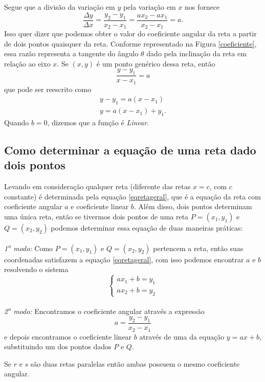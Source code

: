 Segue que a divisão da variação em $y$ pela variação em $x$ nos fornece
\begin{equation}\label{eqdelta}
  \frac{\Delta y}{\Delta x}
  = \frac{y_2-y_1}{x_2-x_1}
  = \frac{ax_2-ax_1}{x_2-x_1}
  = a.
\end{equation}
Isso quer dizer que podemos obter o valor do coeficiente angular da reta a
partir de dois pontos quaisquer da reta.
Conforme representado na Figura \ref{coeficiente}, essa razão representa
a tangente do ângulo $\theta$ dado pela inclinação da reta em relação
ao eixo $x$.
Se $(x, y)$ é um ponto genérico dessa reta, então
\[
  \frac{y-y_1}{x-x_1}=a
\]
que pode ser reescrito como
\begin{gather*}
  y-y_1 = a(x-x_1)  \nonumber \\
  y = a(x-x_1)+y_1. \label{eqdareta}
\end{gather*}
Quando $b=0$, dizemos que a função é \emph{Linear}.

\subsection{Como determinar a equação de uma reta dado dois pontos}

Levando em consideração qualquer reta (diferente das retas $x=c$, com $c$
constante) é determinada pela equação \eqref{eqretageral}, que é a equação da
reta com coeficiente angular $a$ e coeficiente linear $b$. Além disso, dois
pontos determinam uma única reta, então se tivermos dois pontos de uma reta
$P=(x_1, y_1)$ e $Q=(x_2, y_2)$ podemos determinar essa equação de duas maneiras
práticas:

\emph{1\textsuperscript{o} modo:}
Como $P=(x_1, y_1)$ e $Q=(x_2, y_2)$ pertencem a reta,
então suas coordenadas satisfazem a equação \ref{eqretageral}, com isso podemos
encontrar $a$ e $b$ resolvendo o sistema
\[
  \begin{cases}
    ax_1+b=y_1 \\
    ax_2+b=y_2
  \end{cases}
\]

\emph{2\textsuperscript{o} modo:}
Encontramos o coeficiente angular através a
expressão
\[
  a = \frac{y_2-y_1}{x_2-x_1}
\]
e depois encontramos o coeficiente linear $b$ através de uma da
equação $y=ax+b$, substituindo um dos pontos dados
$P$ e $Q$.

\begin{observation}
  Se $r$ e $s$ são duas retas paralelas então ambas possuem o mesmo
  coeficiente angular.
\end{observation}

